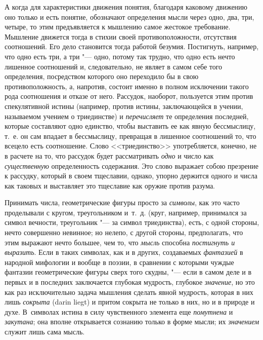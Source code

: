 А когда для характеристики движения понятия, благодаря каковому движению оно
только и есть понятие, обозначают определения мысли через одно, два, три,
четыре, то этим предъявляется к мышлению самое жестокое требование.
Мышление движется тогда в стихии своей противоположности, отсутствия
соотношений. Его дело становится тогда работой безумия. Постигнуть,
например, что одно есть три, а три "--- одно, потому так трудно, что одно есть
нечто лишенное соотношений и, следовательно, не являет в самом себе того
определения, посредством которого оно переходило бы в свою
противоположность, а, напротив, состоит именно в полном исключении такого
рода соотношения и отказе от него. Рассудок, наоборот, пользуется этим
против спекулятивной истины (например, против истины, заключающейся в
учении, называемом учением о триединстве) и
{\em перечисляет} те определения последней, которые
составляют одно единство, чтобы выставить ее как явную бессмыслицу, т.~е.
он сам впадает в бессмыслицу, превращая в лишенное соотношений то, что
всецело есть соотношение. Слово <<триединство>> употребляется, конечно, не в
расчете на то, что рассудок будет рассматривать
{\em одно} и число как
{\em существенную} определенность содержания. Это слово
выражает собою презрение к рассудку, который в своем тщеславии, однако,
упорно держится одного и числа как таковых и выставляет это тщеславие как
оружие против разума.

Принимать числа, геометрические фигуры просто за
{\em символы}, как это часто проделывали с кругом,
треугольником и~т.~д. (круг, например, принимался за символ вечности,
треугольник "--- за символ триединства), есть, с одной стороны, нечто
совершенно невинное; но нелепо, с другой стороны, предполагать, что этим
выражают нечто большее, чем то, что {\em мысль}
способна {\em постигнуть и выразить}. Если в таких
символах, как и в других, создаваемых {\em фантазией} в
народной мифологии и вообще в поэзии, в сравнении с которыми чуждые
фантазии геометрические фигуры сверх того скудны, "--- если в самом деле и в
первых и в последних заключается глубокая мудрость, глубокое
{\em значение}, но это как раз исключительно задача
мышления сделать явной мудрость, которая в них лишь
{\em сокрыта} (darin liegt) и притом сокрыта не только
в них, но и в природе и духе. В~символах истина в силу чувственного
элемента еще {\em помутнена} и
{\em закутана}; она вполне открывается сознанию только
в форме мысли; их {\em значением} служит лишь сама
мысль.

